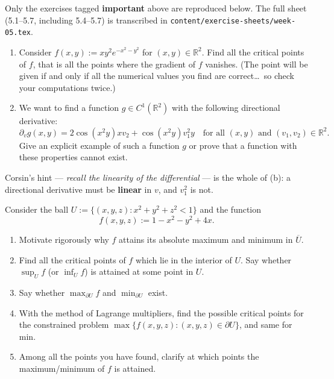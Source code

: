 \begin{ainote}
Only the exercises tagged \textbf{important} above are reproduced below. The full sheet
(5.1--5.7, including 5.4--5.7) is transcribed in \texttt{content/exercise-sheets/week-05.tex}.
\end{ainote}

\begin{exercise}
\label{ex:5.1}
\begin{enumerate}[label=\textbf{(\alph*)}]
  \item Consider $f(x,y) := xy^2e^{-x^2-y^2}$ for $(x,y) \in \mathbb{R}^2$. Find all the critical
    points of $f$, that is all the points where the gradient of $f$ vanishes. (The point will be
    given if and only if all the numerical values you find are correct\ldots\ so check your
    computations twice.)
  \item We want to find a function $g \in C^1(\mathbb{R}^2)$ with the following directional
    derivative:
    \[\partial_v g(x,y) = 2\cos(x^2y)xv_2 + \cos(x^2y)v_1^2y \quad \text{for all } (x,y) \text{ and } (v_1,v_2) \in \mathbb{R}^2.\]
    Give an explicit example of such a function $g$ or prove that a function with these
    properties cannot exist.
\end{enumerate}
\end{exercise}

\begin{remark}
Corsin's hint --- \textit{recall the linearity of the differential} --- is the whole of
(b): a directional derivative must be \textbf{linear} in $v$, and $v_1^2$ is not.
\end{remark}

\begin{exercise}
\label{ex:5.2}
Consider the ball $U := \{(x,y,z) : x^2+y^2+z^2 < 1\}$ and the function
\[f(x,y,z) := 1 - x^2 - y^2 + 4x.\]
\begin{enumerate}[label=\textbf{\arabic*.}]
  \item Motivate rigorously why $f$ attains its absolute maximum and minimum in $\overline{U}$.
  \item Find all the critical points of $f$ which lie in the interior of $U$. Say whether
    $\sup_U f$ (or $\inf_U f$) is attained at some point in $U$.
  \item Say whether $\max_{\partial U} f$ and $\min_{\partial U}$ exist.
  \item With the method of Lagrange multipliers, find the possible critical points for the
    constrained problem $\max\{f(x,y,z) : (x,y,z) \in \partial U\}$, and same for min.
  \item Among all the points you have found, clarify at which points the maximum/minimum of $f$
    is attained.
\end{enumerate}
\end{exercise}

